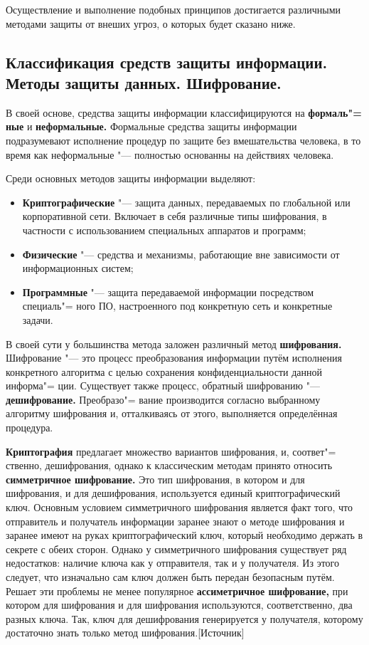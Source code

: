 Осуществление и выполнение подобных принципов достигается различными методами защиты от внеших угроз, о которых будет сказано ниже.


\newpage
\subsection{Классификация средств защиты информации. Методы защиты данных. Шифрование.}
В своей основе, средства защиты информации классифицируются на \textbf{формаль"=
ные} и \textbf{неформальные.} Формальные средства защиты информации подразумевают исполнение процедур по защите 
без вмешательства человека, в то время как неформальные "--- полностью основанны на действиях человека.

Среди основных методов защиты информации выделяют:
\begin{itemize}
    \item \textbf{Криптографические} "--- защита данных, передаваемых по глобальной или корпоративной сети. Включает в себя различные типы шифрования, в частности с использованием специальных аппаратов
    и программ;
    \item \textbf{Физические} "--- средства и механизмы, работающие вне зависимости от информационных систем;
    \item \textbf{Программные} "--- защита передаваемой информации посредством специаль"=
    ного ПО, настроенного под конкретную сеть и конкретные задачи.
\end{itemize}

В своей сути у большинства метода заложен различный метод \textbf{шифрования.} Шифрование "--- это процесс преобразования информации путём исполнения конкретного алгоритма с целью сохранения конфиденциальности
данной информа"=
ции. Существует также процесс, обратный шифрованию "--- \textbf{дешифрование.} Преобразо"=
вание производится согласно выбранному алгоритму шифрования 
и, отталкиваясь от этого, выполняется определённая процедура.

\textbf{Криптография} предлагает множество вариантов шифрования, и, соответ"=
ственно, дешифрования, однако к классическим методам принято относить \textbf{симметричное шифрование.} Это тип шифрования, в котором и для шифрования, и для дешифрования,
используется единый криптографический ключ. Основным условием симметричного шифрования является факт того, что отправитель и получатель информации заранее знают о 
методе шифрования и заранее имеют на руках криптографический ключ, который необходимо держать в секрете с обеих сторон. Однако у симметричного шифрования существует ряд недостатков: наличие ключа как у отправителя, так и у получателя.
Из этого следует, что изначально сам ключ должен быть передан безопасным путём. Решает эти проблемы не менее популярное \textbf{ассиметричное шифрование,} при котором для шифрования и для шифрования используются, соответственно, два разных ключа.
Так, ключ для дешифрования генерируется у получателя, которому достаточно знать только метод шифрования.[Источник]





